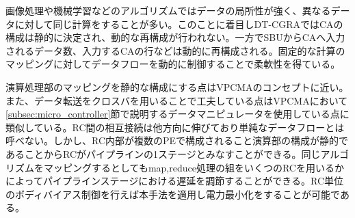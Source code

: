 {画像処理や機械学習などのアルゴリズムではデータの局所性が強く、異なるデータに対して同じ計算をすることが多い。このことに着目しDT-CGRAではCAの構成は静的に決定され、動的な再構成が行われない。一方でSBUからCAへ入力されるデータ数、入力するCAの行などは動的に再構成される。固定的な計算のマッピングに対してデータフローを動的に制御することで柔軟性を得ている。

演算処理部のマッピングを静的な構成にする点はVPCMAのコンセプトに近い。また、データ転送をクロスバを用いることで工夫している点はVPCMAにおいて\ref{subsec:micro_controller}節で説明するデータマニピュレータを使用している点に類似している。RC間の相互接続は他方向に伸びており単純なデータフローとは呼べない。しかし、RC内部が複数のPEで構成されること演算部の構成が静的であることからRCがパイプラインの1ステージとみなすことができる。同じアルゴリズムをマッピングするとしてもmap,reduce処理の組をいくつのRCを用いるかによってパイプラインステージにおける遅延を調節することができる。RC単位のボディバイアス制御を行えば本手法を適用し電力最小化をすることが可能である。

}